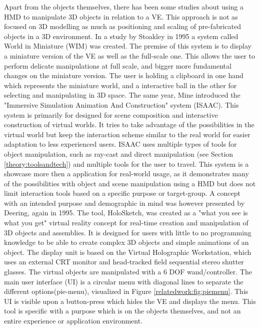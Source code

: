 Apart from the objects themselves, there has been some studies about using a HMD to manipulate 3D objects in relation to a VE. This approach is not as focused on 3D modelling as much as positioning and scaling of pre-fabricated objects in a 3D environment. In a study by Stoakley in 1995 a system called World in Miniature (WIM) was created\cite{relatedwork:stoakley1995virtual}. The premise of this system is to display a miniature version of the VE as well as the full-scale one. This allows the user to perform delicate manipulations at full scale, and bigger more fundamental changes on the miniature version. The user is holding a clipboard in one hand which represents the miniature world, and a interactive ball in the other for selecting and manipulating in 3D space. The same year, Mine introduced the "Immersive Simulation
Animation And Construction" system (ISAAC)\cite{relatedwork:mine1995isaac}. This system is primarily for designed for scene composition and interactive construction of virtual worlds. It tries to take advantage of the possibilities in the virtual world but keep the interaction scheme similar to the real world for easier adaptation to less experienced users. ISAAC uses multiple types of tools for object manipulation, such as ray-cast and direct manipulation (see Section \ref{theory:toolsandtech}) and multiple tools for the user to travel. This system is a showcase more then a application for real-world usage, as it demonstrates many of the possibilities with object and scene manipulation using a HMD but does not limit interaction tools based on a specific purpose or target-group. A concept with an intended purpose and demographic in mind was however presented by Deering, again in 1995\cite{relatedwork:deering1995holosketch}. The tool, HoloSketch, was created as a "what you see is what you get" virtual reality concept for real-time creation and manipulation of 3D objects and assemblies. It is designed for users with little to no programming knowledge to be able to create complex 3D objects and simple animations of an object. The display unit is based on the Virtual Holographic Workstation\cite{relatedwork:deering1992high}, which uses an external CRT monitor and head-tracked field sequential stereo shutter glasses. The virtual objects are manipulated with a 6 DOF wand/controller. The main user interface (UI) is a circular menu with diagonal lines to separate the different options(pie-menu), visualized in Figure \ref{relatedwork:fig:piemenu}. This UI is visible upon a button-press which hides the VE and displays the menu. This tool is specific with a purpose which is on the objects themselves, and not an entire experience or application environment.
